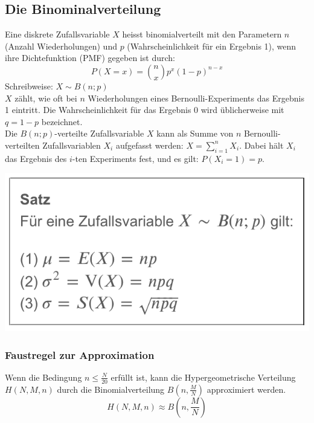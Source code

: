 \subsection{Die Binominalverteilung}
\label{subsec:binominalverteilung}
Eine diskrete Zufallsvariable $X$ heisst binomialverteilt mit den Parametern $n$ (Anzahl Wiederholungen) und $p$ (Wahrscheinlichkeit für ein Ergebnis 1), 
wenn ihre Dichtefunktion (PMF) gegeben ist durch:
\begin{equation*}
    P(X = x) = \binom{n}{x}p^x(1-p)^{n-x}
\end{equation*}
Schreibweise: $X \sim B(n; p)$ \\
$X$ zählt, wie oft bei $n$ Wiederholungen eines Bernoulli-Experiments das Ergebnis 1 eintritt. Die Wahrscheinlichkeit für das Ergebnis 0 wird
üblicherweise mit $q = 1 - p$ bezeichnet. \\
Die $B(n; p)$-verteilte Zufallsvariable $X$ kann als Summe von $n$ Bernoulli-verteilten Zufallsvariablen $X_i$ aufgefasst werden: $X=\sum_{i=1}^n X_i$.
Dabei hält $X_i$ das Ergebnis des $i$-ten Experiments fest, und es gilt: $P(X_i = 1) = p$.
\begin{center}
    \includegraphics[width=0.5\linewidth]{images/satz4.png}
\end{center}
\subsubsection{Faustregel zur Approximation}
\label{subsubsec:faustregel_approximation}
Wenn die Bedingung $n \leq \frac{N}{20}$ erfüllt ist, kann die Hypergeometrische Verteilung $H(N, M, n)$ durch die Binomialverteilung $B(n, \frac{M}{N})$
approximiert werden. \\
\begin{equation*}
    H(N,M,n) \approx B(n, \frac{M}{N})
\end{equation*}

